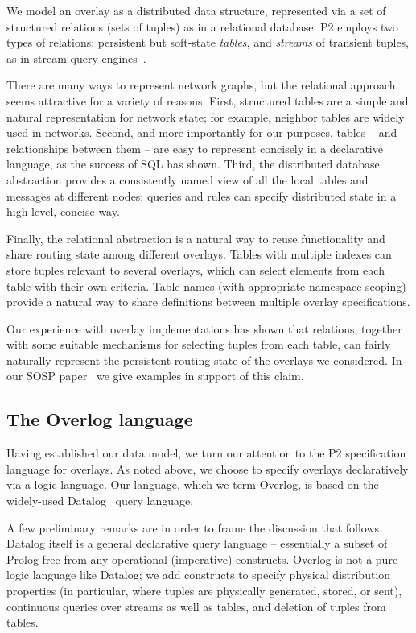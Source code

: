 \documentclass[twocolumn,10pt]{article}
\def\Sys{P2\xspace}
\def\Lang{Overlog\xspace}
\begin{document}
We model an overlay as a distributed data structure,
represented via a set of structured relations (sets of tuples)
as in a relational database.  \Sys employs two types
of relations: persistent but soft-state {\em tables}, and
{\em streams} of transient tuples, as in stream query
engines~\cite{aurora,telegraphcq,stream}.

There are many ways to represent network graphs, but the relational
approach seems attractive for a variety of reasons.  
First, structured tables are a simple and natural representation for
network state; for example, neighbor tables are widely used in
networks.
Second, and more importantly for our purposes, tables -- and
relationships between them -- are easy to represent concisely in a
declarative language, as the success of SQL has shown.
Third, the distributed database abstraction
provides a consistently named view of all the 
local tables and messages at different nodes: queries and rules can
specify distributed state in a high-level, concise way.

Finally, the relational abstraction is a natural way to reuse
functionality and share routing state among different overlays.
Tables with multiple indexes can store tuples relevant to several
overlays, which can select elements from each table with their own
criteria.  Table names (with appropriate namespace scoping) provide 
a natural way to share definitions between multiple overlay
specifications. 


Our experience with overlay implementations has shown that relations,
together with some suitable mechanisms for selecting tuples from each
table, can fairly naturally represent the persistent routing state of
the overlays we considered.  In our SOSP paper~\cite{p2_sosp05} we
give examples in support of this claim.

\subsection{The \Lang language}
\label{sec:overlog}

Having established our data model, we turn our attention to the \Sys
specification language for overlays.  As noted above, we choose to
specify overlays declaratively via a logic language.  Our language,
which we term \Lang, is based on the widely-used
Datalog~\cite{alicebook} query language.

A few preliminary remarks are in order to frame the discussion that
follows.  Datalog itself is a general declarative query language --
essentially a subset of Prolog free from any operational (imperative) constructs.
\Lang is not a pure logic language like Datalog; we add constructs to
specify physical distribution properties (in particular, where tuples
are physically generated, stored, or sent), continuous queries over
streams as well as tables, and deletion of tuples from tables. 
\end{document}
